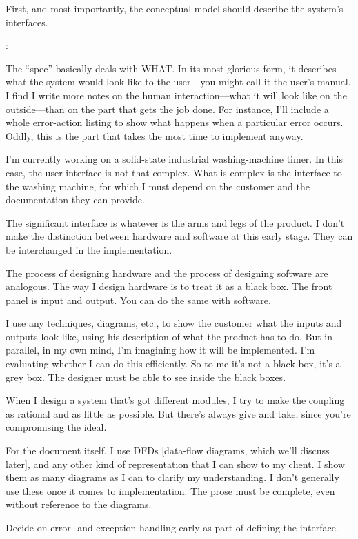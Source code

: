 \begin{tip}
First, and most importantly, the conceptual model should describe the
system's interfaces.
\end{tip}%
\begin{interview}
:

\begin{tfquot}
The ``spec'' basically deals with WHAT. In its most glorious form, it
describes what the system would look like to the user---you might call it the
user's manual. I find I write more notes on the human interaction---what it
will look like on the outside---than on the part that gets the job
done. For instance, I'll include a whole error-action listing to show
what happens when a particular error occurs. Oddly, this is the part
that takes the most time to implement anyway.

I'm currently working on a solid-state industrial washing-machine
timer. In this case, the user interface is not that complex. What is
complex is the interface to the washing machine, for which I must
depend on the customer and the documentation they can provide.

The significant interface is whatever is the arms and legs of the
product. I don't make the distinction between hardware and software at
this early stage. They can be interchanged in the implementation.

The process of designing hardware and the process of designing
software are analogous. The way I design hardware is to treat it as a
black box. The front panel is input and output. You can do the same
with software.

I use any techniques, diagrams, etc., to show the customer what the
inputs and outputs look like, using his description of what the
product has to do.  But in parallel, in my own mind, I'm imagining how
it will be implemented.  I'm evaluating whether I can do this
efficiently. So to me it's not a black box, it's a grey box. The
designer must be able to see inside the black boxes.

When I design a system that's got different modules, I try to make the
coupling as rational and as little as possible. But there's always
give and take, since you're compromising the ideal.

For the document itself, I use DFDs {[}data-flow diagrams, which we'll
discuss later{]}, and any other kind of representation that I can show
to my client. I show them as many diagrams as I can to clarify my
understanding.  I don't generally use these once it comes to
implementation. The prose must be complete, even without reference to
the diagrams.
\end{tfquot}
\end{interview}%
%
\begin{tip}
Decide on error- and exception-handling early as part of defining the
interface.
\end{tip}

